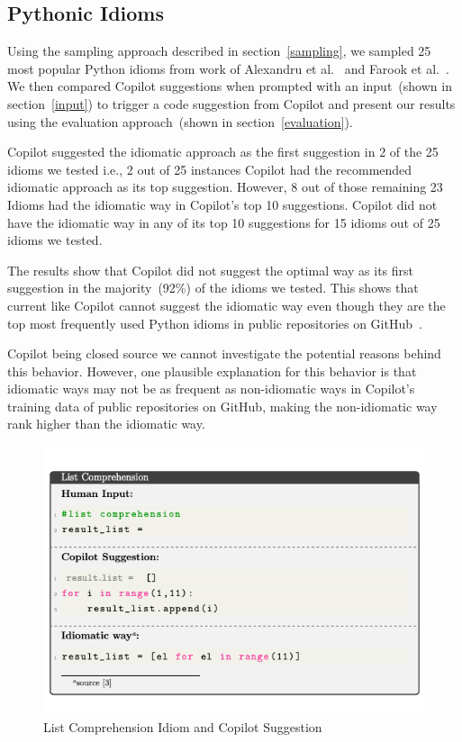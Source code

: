 \subsection{Pythonic Idioms}
\label{idioms}
Using the sampling approach described in section~\ref{sampling}, we sampled 25 most popular Python idioms from work of Alexandru et al.~\cite{Alexandru2018} and Farook et al.~\cite{idioms}. 
We then compared Copilot suggestions when prompted with an input~(shown in section~\ref{input}) to trigger a code suggestion from Copilot and present our results using the evaluation approach~(shown in section~\ref{evaluation}).

Copilot suggested the idiomatic approach as the first suggestion in 2 of the 25 idioms we tested i.e., 2 out of 25 instances Copilot had the recommended idiomatic approach as its top suggestion. 
However, 8 out of those remaining 23 Idioms had the idiomatic way in Copilot's top 10 suggestions. Copilot did not have the idiomatic way in any of its top 10 suggestions for 15 idioms out of 25 idioms we tested.

The results show that Copilot did not suggest the optimal way as its first suggestion in the majority~(92\%) of the idioms we tested. This shows that current \cct{} like Copilot cannot suggest the idiomatic way even though they are the top most frequently used Python idioms in public repositories on GitHub~\cite{Alexandru2018, idioms}. 

Copilot being closed source we cannot investigate the potential reasons behind this behavior. However, one plausible explanation for this behavior is that idiomatic ways may not be as frequent as non-idiomatic ways in Copilot's training data of public repositories on GitHub, making the non-idiomatic way rank higher than the idiomatic way.

\begin{figure}[hbt!]
    \centering
    \includegraphics[width=\linewidth]{Figures/idioms_1.png}
    \caption{List Comprehension Idiom and Copilot Suggestion}
    \label{fig:idioms_1}
\end{figure}

